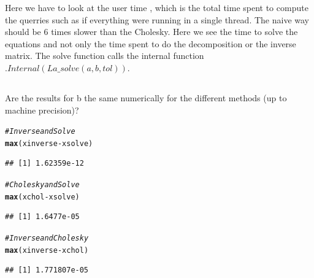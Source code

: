 \documentclass{llncs}\usepackage[]{graphicx}\usepackage[]{color}
\makeatletter
\newcommand{\hlcom}[1]{\textcolor[rgb]{0.678,0.584,0.686}{\textit{#1}}}%
\newcommand{\hlopt}[1]{\textcolor[rgb]{0,0,0}{#1}}%
\newcommand{\hlstd}[1]{\textcolor[rgb]{0.345,0.345,0.345}{#1}}%
\newcommand{\hlkwd}[1]{\textcolor[rgb]{0.737,0.353,0.396}{\textbf{#1}}}%
\newenvironment{kframe}{%
 \def\at@end@of@kframe{}%
 \ifinner\ifhmode%
  \def\at@end@of@kframe{\end{minipage}}%
  \begin{minipage}{\columnwidth}%
 \fi\fi%
 \def\FrameCommand##1{\hskip\@totalleftmargin \hskip-\fboxsep
 \colorbox{shadecolor}{##1}\hskip-\fboxsep
     \hskip-\linewidth \hskip-\@totalleftmargin \hskip\columnwidth}%
 \MakeFramed {\advance\hsize-\width
   \@totalleftmargin\z@ \linewidth\hsize
   \@setminipage}}%
 {\par\unskip\endMakeFramed%
 \at@end@of@kframe}
\newenvironment{knitrout}{}{} %
\makeatother
\begin{document}
Here we have to look at the user time , which is the total time spent to compute the querries such as if everything were running in a single thread.
The naive way should be 6 times slower than the Cholesky. Here we see the time to solve the equations and not only the time spent to do the decomposition or the inverse matrix. The solve function calls the internal function $.Internal(La\_solve(a, b, tol))$.

\subsection{}
Are the results for b the same numerically for the different methods (up to machine precision)? 
\begin{knitrout}
\color{fgcolor}\begin{kframe}
\begin{alltt}
\hlcom{# Inverse and Solve}
\hlkwd{max}\hlstd{(xinverse}\hlopt{-}\hlstd{xsolve)}
\end{alltt}
\begin{lstlisting}[basicstyle=\ttfamily,breaklines=true]
## [1] 1.62359e-12
\end{lstlisting}
\begin{alltt}
\hlcom{# Cholesky and Solve}
\hlkwd{max}\hlstd{(xchol}\hlopt{-}\hlstd{xsolve)}
\end{alltt}
\begin{lstlisting}[basicstyle=\ttfamily,breaklines=true]
## [1] 1.6477e-05
\end{lstlisting}
\begin{alltt}
\hlcom{# Inverse and Cholesky}
\hlkwd{max}\hlstd{(xinverse}\hlopt{-}\hlstd{xchol)}
\end{alltt}
\begin{lstlisting}[basicstyle=\ttfamily,breaklines=true]
## [1] 1.771807e-05
\end{lstlisting}
\end{kframe}
\end{knitrout}
\end{document}
